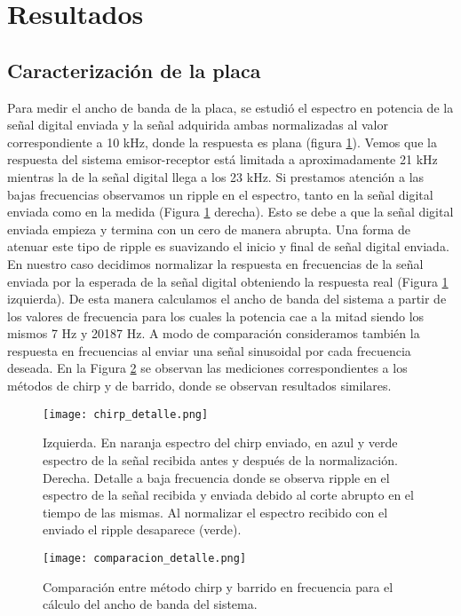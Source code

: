 \documentclass[a4paper, 11pt]{article}
\begin{document}
\section*{Resultados}
\subsection*{Caracterización de la placa}
Para medir el ancho de banda de la placa, se estudió el espectro en potencia de la señal digital enviada y la señal adquirida ambas normalizadas al valor correspondiente a 10 kHz, donde la respuesta es plana (figura \ref{fig:chirp_detalle}). Vemos que la respuesta del sistema emisor-receptor está limitada a aproximadamente 21 kHz mientras la de la señal digital llega a los 23 kHz. Si prestamos atención a las bajas frecuencias observamos un ripple en el espectro, tanto en la señal digital enviada como en la medida (Figura \ref{fig:chirp_detalle} derecha). Esto se debe a que la señal digital enviada empieza y termina con un cero de manera abrupta. Una forma de atenuar este tipo de ripple es suavizando el inicio y final de señal digital enviada. En nuestro caso decidimos normalizar la respuesta en frecuencias de la señal enviada por la esperada de la señal digital obteniendo la respuesta real (Figura \ref{fig:chirp_detalle} izquierda). De esta manera calculamos el ancho de banda del sistema a partir de los valores de frecuencia para los cuales la potencia cae a la mitad siendo los mismos 7 Hz y 20187 Hz.
A modo de comparación consideramos también la respuesta en frecuencias al enviar una señal sinusoidal por cada frecuencia deseada. En la Figura \ref{fig:comparacionancho} se observan las mediciones correspondientes a los métodos de chirp y de barrido, donde se observan resultados similares. 

\begin{figure} [H]
\centering
\texttt{[image: chirp\_detalle.png]}
\caption{Izquierda. En naranja espectro del chirp enviado, en azul y verde espectro de la señal recibida antes y después de la normalización. Derecha. Detalle a baja frecuencia donde se observa ripple en el espectro de la señal recibida y enviada debido al corte abrupto en el tiempo de las mismas. Al normalizar el espectro recibido con el enviado el ripple desaparece (verde).   \label{fig:chirp_detalle}}
\end{figure}


\begin{figure} [H]
\centering
\texttt{[image: comparacion\_detalle.png]}
\caption{Comparación entre método chirp y barrido en frecuencia para el cálculo del ancho de banda del sistema.\label{fig:comparacionancho}}
\end{figure} 
\end{document}

